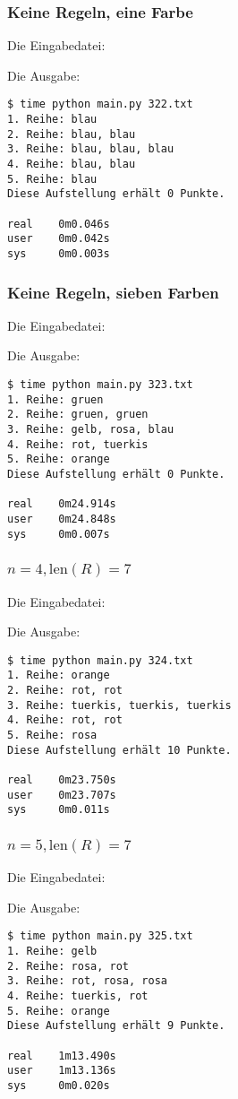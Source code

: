 \documentclass[a4paper,10pt,ngerman]{scrartcl}
\begin{document}
\subsubsection{Keine Regeln, eine Farbe}
Die Eingabedatei:


Die Ausgabe:
\begin{lstlisting}
$ time python main.py 322.txt 
1. Reihe: blau
2. Reihe: blau, blau
3. Reihe: blau, blau, blau
4. Reihe: blau, blau
5. Reihe: blau
Diese Aufstellung erhält 0 Punkte.

real    0m0.046s
user    0m0.042s
sys     0m0.003s
\end{lstlisting}

\subsubsection{Keine Regeln, sieben Farben}
Die Eingabedatei:


Die Ausgabe:
\begin{lstlisting}
$ time python main.py 323.txt 
1. Reihe: gruen
2. Reihe: gruen, gruen
3. Reihe: gelb, rosa, blau
4. Reihe: rot, tuerkis
5. Reihe: orange
Diese Aufstellung erhält 0 Punkte.

real    0m24.914s
user    0m24.848s
sys     0m0.007s
\end{lstlisting}

\subsubsection{$n=4, \textrm{len}(R)=7$}
\label{sec:47}
Die Eingabedatei:


Die Ausgabe:
\begin{lstlisting}
$ time python main.py 324.txt 
1. Reihe: orange
2. Reihe: rot, rot
3. Reihe: tuerkis, tuerkis, tuerkis
4. Reihe: rot, rot
5. Reihe: rosa
Diese Aufstellung erhält 10 Punkte.

real    0m23.750s
user    0m23.707s
sys     0m0.011s
\end{lstlisting}

\subsubsection{$n=5, \textrm{len}(R)=7$}
\label{sec:57}
Die Eingabedatei:


Die Ausgabe:
\begin{lstlisting}
$ time python main.py 325.txt 
1. Reihe: gelb
2. Reihe: rosa, rot
3. Reihe: rot, rosa, rosa
4. Reihe: tuerkis, rot
5. Reihe: orange
Diese Aufstellung erhält 9 Punkte.

real    1m13.490s
user    1m13.136s
sys     0m0.020s
\end{lstlisting}
\end{document}
